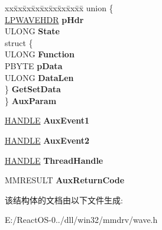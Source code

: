 \begin{DoxyCompactItemize}
\begin{tabbing}
xx\=xx\=xx\=xx\=xx\=xx\=xx\=xx\=xx\=\kill
union \{\\
\>\hyperlink{structwavehdr__tag}{LPWAVEHDR} {\bfseries pHdr}\\
\>ULONG {\bfseries State}\\
\>struct \{\\
\>\>ULONG {\bfseries Function}\\
\>\>PBYTE {\bfseries pData}\\
\>\>ULONG {\bfseries DataLen}\\
\>\} {\bfseries GetSetData}\\
\} {\bfseries AuxParam}\\

\end{tabbing}\item 
\mbox{\label{structtag___w_a_v_e_a_l_l_o_c_a13fda745cc91edff28ebdd3069a29e60}} 
\hyperlink{interfacevoid}{H\+A\+N\+D\+LE} {\bfseries Aux\+Event1}
\item 
\mbox{\label{structtag___w_a_v_e_a_l_l_o_c_af19eec6ac4ddff7d5f4ce8e5fae2f0b4}} 
\hyperlink{interfacevoid}{H\+A\+N\+D\+LE} {\bfseries Aux\+Event2}
\item 
\mbox{\label{structtag___w_a_v_e_a_l_l_o_c_a5684ae2bf41795d4ed6037fb3a7d0102}} 
\hyperlink{interfacevoid}{H\+A\+N\+D\+LE} {\bfseries Thread\+Handle}
\item 
\mbox{\label{structtag___w_a_v_e_a_l_l_o_c_af405d1c8658633d912b352758fb51c69}} 
M\+M\+R\+E\+S\+U\+LT {\bfseries Aux\+Return\+Code}
\end{DoxyCompactItemize}


该结构体的文档由以下文件生成\+:\begin{DoxyCompactItemize}
\item 
E\+:/\+React\+O\+S-\/0../dll/win32/mmdrv/wave.\+h\end{DoxyCompactItemize}
